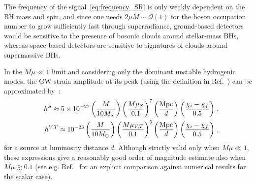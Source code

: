 \documentclass[11pt]{article}
\numberwithin{equation}{section} %
\begin{document}
The frequency of the signal~\eqref{eq:frequency_SR} is only weakly dependent on the BH mass and spin, and since one needs $2\mu M\sim \mathcal{O}(1)$ for the boson occupation number to grow sufficiently fast through superradiance, ground-based detectors would be sensitive to the presence of bosonic clouds around stellar-mass BHs, whereas space-based detectors are sensitive to signatures of clouds around supermassive BHs.


In the $M\mu\ll 1$ limit and considering only the dominant unstable hydrogenic modes, the GW strain amplitude at its peak (using the definition in Ref.~\cite{Zhu:2020tht}) can be approximated by~\cite{Yoshino:2013ofa,Arvanitaki:2014wva,Brito:2014wla,Brito:2017zvb,Baryakhtar:2017ngi,Siemonsen:2019ebd,Brito:2020lup}:
%
\begin{eqnarray}\label{eq:h0_approx}
&& h^{S} \approx 5\times 10^{-27} \left(\frac{M}{10 M_{\odot}}\right)
\left(\frac{M\mu_S}{0.1}\right)^7 \left(\frac{\rm Mpc}{d}\right) 
\left(\frac{\chi_i - \chi_f}{0.5}\right)\,,\\
&& h^{V,T} \approx 10^{-23} \left(\frac{M}{10 M_{\odot}}\right)
\left(\frac{M\mu_{V,T}}{0.1}\right)^5 \left(\frac{\rm Mpc}{d}\right) 
\left(\frac{\chi_i - \chi_f}{0.5}\right)\,,
\end{eqnarray}
for a source at luminosity distance $d$. Although strictly valid only when $M\mu\ll 1$, these expressions give a reasonably good order of magnitude estimate also when $M\mu\gtrsim 0.1$ (see e.g. Ref.~\cite{Isi:2018pzk} for an explicit comparison against numerical results for the scalar case).
\end{document}
